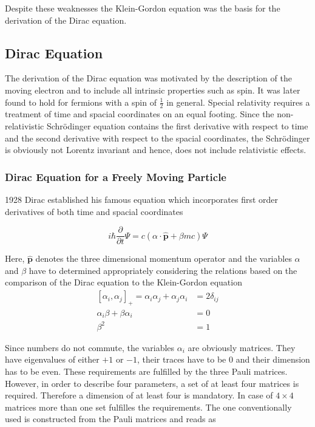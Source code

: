 Despite these weaknesses the Klein-Gordon equation was the basis for the
derivation of the Dirac equation.


\subsection{Dirac Equation}
The derivation of the Dirac equation was motivated by the description of the
moving electron and to include all intrinsic properties such as spin.
It was later found to hold for fermions with a spin of $\frac12$ in general.
Special relativity requires a treatment of time and spacial coordinates on an
equal footing. Since the non-relativistic Schrödinger equation contains the first
derivative with respect to time and the second derivative with respect to the spacial
coordinates, the Schrödinger is obviously not Lorentz invariant and hence,
does not include relativistic effects.


\subsubsection{Dirac Equation for a Freely Moving Particle}\label{freep}
1928 Dirac established his famous equation which incorporates first order
derivatives of both time and spacial coordinates \cite{Dirac28_1}

\begin{equation}\label{diracg}
i\hbar \frac\partial{\partial t} \Psi = c (\alpha\cdot\hat{\mathbf{p}}+\beta mc) \Psi
\end{equation}

Here, $\hat{\mathbf{p}}$ denotes the three dimensional momentum operator and
the variables $\alpha$ and $\beta$ have to determined appropriately considering
the relations based on the comparison of the Dirac equation to the Klein-Gordon
equation
\begin{align}
\left[\alpha_i,\alpha_j\right]_+ = \alpha_i\alpha_j + \alpha_j\alpha_i
                                &= 2\delta_{ij}\\
  \alpha_i\beta + \beta\alpha_i &= 0 \\
  \beta^2                       &= 1
\end{align}

Since numbers do not commute, the variables $\alpha_i$ are obviously matrices.
They have eigenvalues of either $+1$ or $-1$, their traces have to be 0
and their dimension has to be even. These requirements are fulfilled by the
three Pauli matrices. However, in order to describe four parameters, a set of
at least four matrices is required. Therefore a dimension of at least four is
mandatory. In case of $4\times 4$ matrices more than one set fulfilles the
requirements. The one conventionally used is constructed from the Pauli matrices
and reads as

